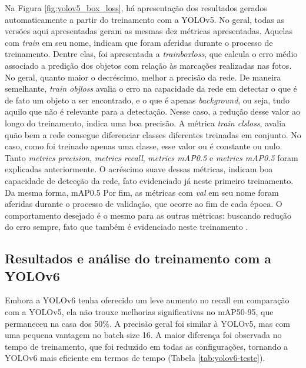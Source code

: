Na Figura \ref{fig:yolov5_box_loss}, há apresentação dos resultados gerados automaticamente a partir do treinamento com a YOLOv5. No geral, todas as versões aqui apresentadas geram as mesmas dez métricas apresentadas. Aquelas com \textit{train} em seu nome, indicam que foram aferidas durante o processo de treinamento. Dentre elas, foi apresentada a \textit{train\textunderscore{}boxloss}, que calcula o erro médio associado a predição dos objetos com relação às marcações realizadas nas fotos. No geral, quanto maior o decréscimo, melhor a precisão da rede. De maneira semelhante, \textit{train obj\textunderscore{}loss} avalia o erro  na capacidade da rede em detectar o que é de fato um objeto a ser encontrado, e o que é apenas \textit{background}, ou seja, tudo aquilo que não é relevante para a detectação. Nesse caso, a redução desse valor ao longo do treinamento, indica uma boa precisão. A métrica \textit{train cls\textunderscore{}loss}, avalia quão bem a rede consegue diferenciar classes diferentes treinadas em conjunto. No caso, como foi treinado apenas uma classe, esse valor ou é constante ou nulo. Tanto \textit{metrics precision}, \textit{metrics recall}, \textit{metrics mAP\textunderscore{}0.5} e \textit{metrics mAP\textunderscore{}0.5} foram explicadas anteriormente. O acréscimo suave dessas métricas, indicam boa capacidade de detecção da rede, fato evidenciado já neste primeiro treinamento. Da mesma forma, mAP\textunderscore{}0.5 Por fim, as métricas com \textit{val} em seu nome foram aferidas durante o processo de validação, que ocorre ao fim de cada época. O comportamento desejado é o mesmo para as outras métricas: buscando redução do erro sempre, fato que também é evidenciado neste treinamento \cite{yolov8_box_loss}.

\subsection{Resultados e análise do treinamento com a YOLOv6}

Embora a YOLOv6 tenha oferecido um leve aumento no recall em comparação com a YOLOv5, ela não trouxe melhorias significativas no mAP50-95, que permaneceu na casa dos 50\%. A precisão geral foi similar à YOLOv5, mas com uma pequena vantagem no batch size 16. A maior diferença foi observada no tempo de treinamento, que foi reduzido em todas as configurações, tornando a YOLOv6 mais eficiente em termos de tempo (Tabela \ref{tab:yolov6-teste}).

